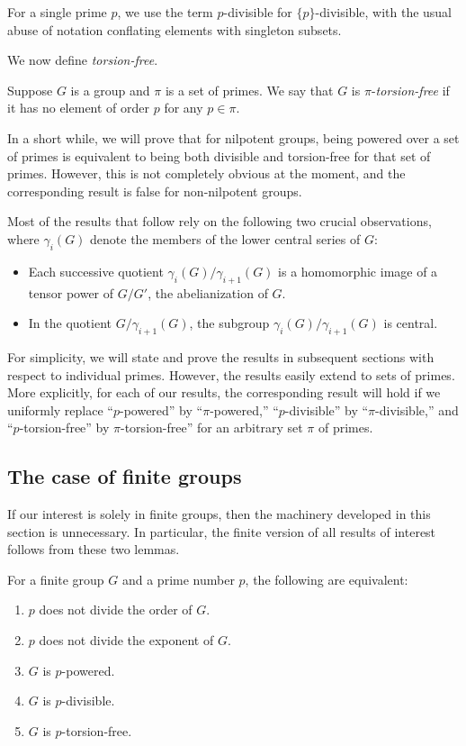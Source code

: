 \documentclass{ucetd}
\begin{document}
For a single prime $p$, we use the term $p$-divisible for $\{ p
\}$-divisible, with the usual abuse of notation conflating elements with
singleton subsets.

We now define {\em torsion-free}.

\begin{definer}
  Suppose $G$ is a group and $\pi$ is a set of primes. We say that $G$
  is $\pi$-{\em torsion-free} if it has no element of order $p$ for
  any $p \in \pi$.
\end{definer}

In a short while, we will prove that for nilpotent groups, being
powered over a set of primes is equivalent to being both divisible and
torsion-free for that set of primes. However, this is not completely
obvious at the moment, and the corresponding result is false for
non-nilpotent groups.

Most of the results that follow rely on the following two crucial
observations, where $\gamma_i(G)$ denote the members of the lower
central series of $G$:

\begin{itemize}
\item Each successive quotient $\gamma_i(G)/\gamma_{i+1}(G)$
  is a homomorphic image of a tensor power of $G/G'$, the
  abelianization of $G$.
\item In the quotient $G/\gamma_{i+1}(G)$, the subgroup
  $\gamma_i(G)/\gamma_{i+1}(G)$ is central.
\end{itemize}

For simplicity, we will state and prove the results in subsequent
sections with respect to individual primes. However, the results
easily extend to sets of primes. More explicitly, for each of our
results, the corresponding result will hold if we uniformly replace
``$p$-powered'' by ``$\pi$-powered,'' ``$p$-divisible'' by
``$\pi$-divisible,'' and ``$p$-torsion-free'' by
$\pi$-torsion-free'' for an arbitrary set $\pi$ of primes.

\subsection{The case of finite groups}

If our interest is solely in finite groups, then the machinery
developed in this section is unnecessary. In particular, the finite
version of all results of interest follows from these two lemmas.

\begin{lemma}\label{finite-groups-pi-p-d-t}
  For a finite group $G$ and a prime number $p$, the following are equivalent:

  \begin{enumerate}
  \item $p$ does not divide the order of $G$.
  \item $p$ does not divide the exponent of $G$.
  \item $G$ is $p$-powered.
  \item $G$ is $p$-divisible.
  \item $G$ is $p$-torsion-free.
  \end{enumerate}
\end{lemma}
\end{document}
